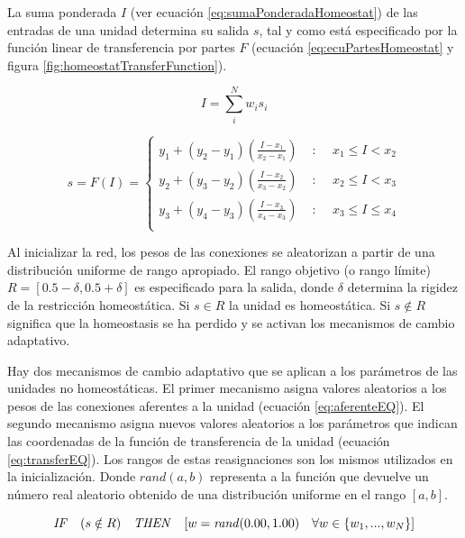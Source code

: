 La suma ponderada $I$ (ver ecuación \ref{eq:sumaPonderadaHomeostat}) de las entradas de una unidad determina su salida $s$, tal y como está especificado por la función linear de transferencia por
partes $F$ (ecuación \ref{eq:ecuPartesHomeostat} y figura \ref{fig:homeostatTransferFunction}).

\begin{equation} \label{eq:sumaPonderadaHomeostat}
	I = \sum_{i}^{N}w_{i}s_{i}
\end{equation}

\begin{equation} \label{eq:ecuPartesHomeostat}
	s = F(I)=\begin{cases}
y_{1}+(y_{2}-y_{1})(\frac{I-x_{1}}{x_{2}-x_{1}}) & \text{ : }\quad x_{1} \leq I < x_{2} \\
y_{2}+(y_{3}-y_{2})(\frac{I-x_{2}}{x_{3}-x_{2}}) & \text{ : }\quad x_{2} \leq I < x_{3} \\
y_{3}+(y_{4}-y_{3})(\frac{I-x_{3}}{x_{4}-x_{3}}) & \text{ : }\quad x_{3} \leq I \leq  x_{4} \\
\end{cases}
\end{equation}

Al inicializar la red, los pesos de las conexiones se aleatorizan a partir de una distribución uniforme de rango apropiado. El rango objetivo (o rango límite) $R = [0.5 - \delta, 0.5 + \delta]$ es
especificado para la salida, donde $\delta$ determina la rigidez de la restricción homeostática. Si $s \in R$ la unidad es homeostática. Si $s \notin R$ significa que la homeostasis se ha perdido
y se activan los mecanismos de cambio adaptativo.

Hay dos mecanismos de cambio adaptativo que se aplican a los parámetros de las unidades no homeostáticas. El primer mecanismo asigna valores aleatorios a los pesos de las conexiones aferentes a la unidad (ecuación \ref{eq:aferenteEQ}).
El segundo mecanismo asigna nuevos valores aleatorios a los parámetros que indican las coordenadas de la función de transferencia de la unidad (ecuación \ref{eq:transferEQ}). Los rangos de estas reasignaciones son los mismos utilizados
en la inicialización. Donde $rand(a,b)$ representa a la función que devuelve un número real aleatorio obtenido de una distribución uniforme en el rango $[a,b]$.

\begin{equation} \label{eq:aferenteEQ}
	\text{\textit{IF}} \quad (s \notin R) \quad \text{\textit{THEN}} \quad [w= \text{\textit{rand}}(0.00, 1.00) \quad \forall w \in \left \{ w_{1},...,w_{N} \right \}]
\end{equation}

